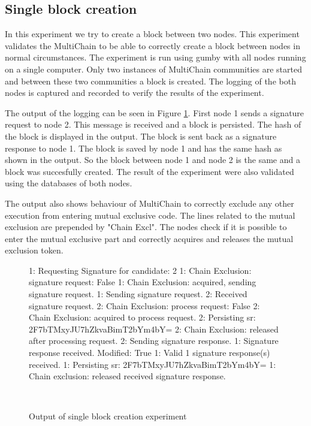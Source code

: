 \subsection{Single block creation}
In this experiment we try to create a block between two nodes.
This experiment validates the MultiChain to be able to correctly create a block between nodes in normal circumstances.
The experiment is run using gumby with all nodes running on a single computer.
Only two instances of MultiChain communities are started and between these two communities a block is created.
The logging of the both nodes is captured and recorded to verify the results of the experiment.

The output of the logging can be seen in Figure \ref{fig:singleblockexperiment}.
First node 1 sends a signature request to node 2.
This message is received and a block is persisted.
The hash of the block is displayed in the output.
The block is sent back as a signature response to node 1.
The block is saved by node 1 and has the same hash as shown in the output.
So the block between node 1 and node 2 is the same and a block was succesfully created.
The result of the experiment were also validated using the databases of both nodes.

The output also shows behaviour of MultiChain
to correctly exclude any other execution from entering mutual exclusive code.
The lines related to the mutual exclusion are prepended by "Chain Excl".
The nodes check if it is possible to enter the mutual exclusive part and correctly acquires
and releases the mutual exclusion token.

\begin{figure}
\begin{FVerbatim}[fontsize=\small]
1: Requesting Signature for candidate: 2
1: Chain Exclusion: signature request: False
1: Chain Exclusion: acquired, sending signature request.
1: Sending signature request.
2: Received signature request.
2: Chain Exclusion: process request: False
2: Chain Exclusion: acquired to process request.
2: Persisting sr: 2F7bTMxyJU7hZkvaBimT2bYm4bY=
2: Chain Exclusion: released after processing request.
2: Sending signature response.
1: Signature response received. Modified: True
1: Valid 1 signature response(s) received.
1: Persisting sr: 2F7bTMxyJU7hZkvaBimT2bYm4bY=
1: Chain exclusion: released received signature response.
\end{FVerbatim}
    \caption{Output of single block creation experiment}~\label{fig:singleblockexperiment}
\end{figure}
